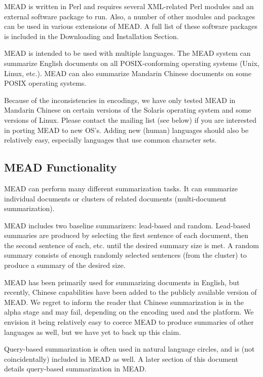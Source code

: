 \documentclass[10pt]{article}
\begin{document}
MEAD is written in Perl and requires several XML-related Perl modules
and an external software package to run.  
Also, a number of other modules and packages can be used in various
extensions of MEAD.
A full list of these software packages is included in the Downloading and
Installation Section.

MEAD is intended to be used with multiple languages.  The MEAD
system can summarize English documents on all POSIX-conforming 
operating systems (Unix, Linux, etc.).  MEAD can also summarize 
Mandarin Chinese documents on some POSIX operating systems.

Because of the inconsistencies in encodings, we have only tested
MEAD in Mandarin Chinese on certain versions of the Solaris 
operating system and some versions of Linux.
Please contact the mailing list (see below) if
you are interested in porting MEAD to new OS's.  Adding new
(human) languages should also be relatively easy, especially
languages that use common character sets. 

\subsection{MEAD Functionality}

MEAD can perform many different summarization tasks.  It can 
summarize individual documents or clusters of related documents
(multi-document summarization).  

MEAD includes two baseline
summarizers: lead-based and random.  Lead-based summaries are
produced by selecting the first sentence of each document, then
the second sentence of each, etc. until the desired summary size
is met.  A random summary consists of enough randomly selected
sentences (from the cluster) to produce a summary of the desired
size.

MEAD has been primarily used for summarizing documents in
English, but recently, Chinese capabilities have been added to
the publicly available version of MEAD.  We regret to inform the
reader that Chinese summarization is in the alpha stage and may
fail, depending on the encoding used and the platform.
We envision it being relatively easy to coerce MEAD to produce
summaries of other languages as well, but we have yet to back up
this claim.

Query-based summarization is often used in natural language
circles, and is (not coincidentally) included in MEAD as well.  A
later section of this document details query-based summarization
in MEAD.
\end{document}
